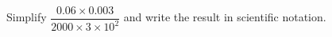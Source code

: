 Simplify $\dfrac{0.06\times0.003}{2000\times3\times10^2}$ and write the result in scientific notation.
